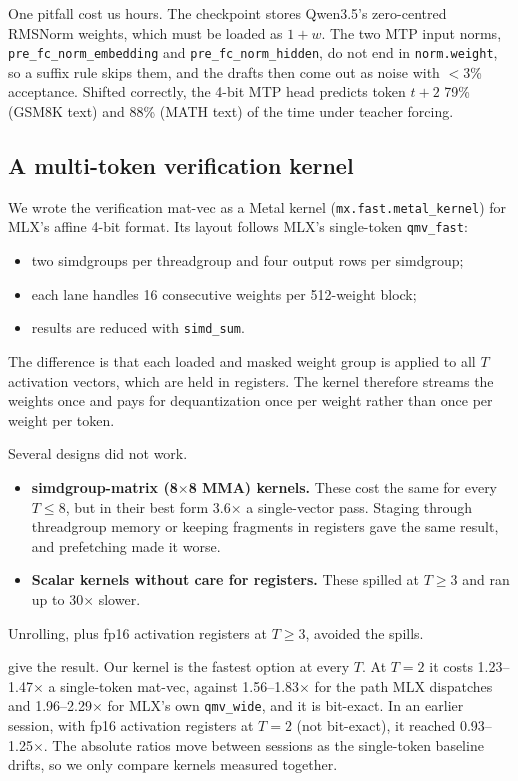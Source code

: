 \documentclass[11pt]{article}
\begin{document}
One pitfall cost us hours. The checkpoint stores Qwen3.5's zero-centred RMSNorm weights, which must be loaded as $1{+}w$. The two MTP input norms, \texttt{pre\_fc\_norm\_embedding} and \texttt{pre\_fc\_norm\_hidden}, do not end in \texttt{norm.weight}, so a suffix rule skips them, and the drafts then come out as noise with $<$3\% acceptance. Shifted correctly, the 4-bit MTP head predicts token $t{+}2$ 79\% (GSM8K text) and 88\% (MATH text) of the time under teacher forcing.

\subsection{A multi-token verification kernel}
\label{sec:kernel}
We wrote the verification mat-vec as a Metal kernel (\texttt{mx.fast.metal\_kernel}) for MLX's affine 4-bit format. Its layout follows MLX's single-token \texttt{qmv\_fast}:
\begin{itemize}
\item two simdgroups per threadgroup and four output rows per simdgroup;
\item each lane handles 16 consecutive weights per 512-weight block;
\item results are reduced with \texttt{simd\_sum}.
\end{itemize}
The difference is that each loaded and masked weight group is applied to all $T$ activation vectors, which are held in registers. The kernel therefore streams the weights once and pays for dequantization once per weight rather than once per weight per token.

Several designs did not work.
\begin{itemize}
\item \textbf{simdgroup-matrix (8$\times$8 MMA) kernels.} These cost the same for every $T{\le}8$, but in their best form 3.6$\times$ a single-vector pass. Staging through threadgroup memory or keeping fragments in registers gave the same result, and prefetching made it worse.
\item \textbf{Scalar kernels without care for registers.} These spilled at $T{\ge}3$ and ran up to 30$\times$ slower.
\end{itemize}
Unrolling, plus fp16 activation registers at $T{\ge}3$, avoided the spills.

 give the result. Our kernel is the fastest option at every $T$. At $T{=}2$ it costs 1.23--1.47$\times$ a single-token mat-vec, against 1.56--1.83$\times$ for the path MLX dispatches and 1.96--2.29$\times$ for MLX's own \texttt{qmv\_wide}, and it is bit-exact. In an earlier session, with fp16 activation registers at $T{=}2$ (not bit-exact), it reached 0.93--1.25$\times$. The absolute ratios move between sessions as the single-token baseline drifts, so we only compare kernels measured together.
\end{document}

